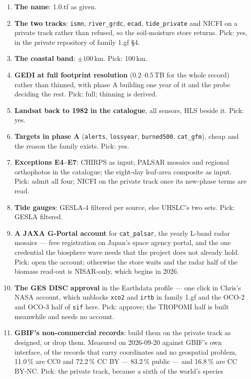 \documentclass[10pt]{article}
\newcommand{\code}[1]{\texttt{#1}}
\begin{document}
\begin{enumerate}\itemsep2pt
\item \textbf{The name}: 1.0.tf as given.
\item \textbf{The two tracks}: \code{ismn}, \code{river\_grdc}, \code{ecad},
\code{tide\_private} and NICFI on a private track rather than refused, so the
soil-moisture store returns. Pick: yes, in the private repository of family
1.gf \S4.
\item \textbf{The coastal band}: $\pm 100$\,km. Pick: 100\,km.
\item \textbf{GEDI at full footprint resolution} (0.2--0.5\,TB for the whole
record) rather than thinned, with phase A building one year of it and the
probe deciding the rest. Pick: full; thinning is derived.
\item \textbf{Landsat back to 1982 in the catalogue}, all sensors, HLS beside
it. Pick: yes.
\item \textbf{Targets in phase A} (\code{alerts}, \code{lossyear},
\code{burned500}, \code{cat\_gfm}), cheap and the reason the family exists.
Pick: yes.
\item \textbf{Exceptions E4--E7}: CHIRPS as input; PALSAR mosaics and
regional orthophotos in the catalogue; the eight-day leaf-area composite as
input. Pick: admit all four; NICFI on the private track once its new-phase
terms are read.
\item \textbf{Tide gauges}: GESLA-4 filtered per source, else UHSLC's two
sets. Pick: GESLA filtered.
\item \textbf{A JAXA G-Portal account} for \code{cat\_palsar}, the yearly
L-band radar mosaics --- free registration on Japan's space agency portal,
and the one credential the biosphere wave needs that the project does not
already hold. Pick: open the account; otherwise the store waits and the
radar half of the biomass read-out is NISAR-only, which begins in 2026.
\item \textbf{The GES DISC approval} in the Earthdata profile --- one click
in Chris's NASA account, which unblocks \code{xco2} and \code{irtb} in
family 1.gf and the OCO-2 and OCO-3 half of \code{sif} here. Pick: approve;
the TROPOMI half is built meanwhile and needs no account.
\item \textbf{GBIF's non-commercial records}: build them on the private
track as designed, or drop them. Measured on 2026-09-20 against GBIF's own
interface, of the records that carry coordinates and no geospatial problem,
11.0\,\% are CC0 and 72.2\,\% CC BY --- 83.2\,\% public --- and 16.8\,\% are
CC BY-NC. Pick: the private track, because a sixth of the world's species

\end{enumerate}
\end{document}
